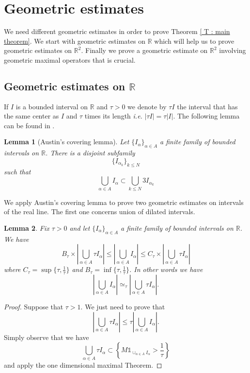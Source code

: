 \documentclass{article}
\newtheorem{lemma}{Lemma}
\begin{document}
\section{Geometric estimates}\label{S:geometric estimate}

We need different geometric estimates in order to prove Theorem \ref{ T : main theorem}. We start with geometric estimates on $\mathbb{R}$ which will help us to prove geometric estimates on $\mathbb{R}^2$. Finally we prove a geometric estimate on $\mathbb{R}^2$ involving geometric maximal operators that is crucial.




\subsection*{Geometric estimates on $\mathbb{R}$}

If $I$ is a bounded interval on $\mathbb{R}$ and $\tau >0$ we denote by $\tau I$ the interval that has the same center as $I$ and $\tau$ times its length \textit{i.e.} $ \left|\tau I \right| = \tau \left| I \right|$. The following lemma can be found in \cite{AUSTIN}.

\begin{lemma}[Austin's covering lemma]
Let $\{ I_\alpha \}_{\alpha \in A}$ a finite family of bounded intervals on $\mathbb{R}$. There is a disjoint subfamily $$\{ I_{ \alpha_k} \}_{k \leq N} $$ such that $$ \bigcup_{\alpha \in A} I_\alpha \subset  \bigcup_{k \leq N} 3 I_{\alpha_k} $$
\end{lemma}

We apply Austin's covering lemma to prove two geometric estimates on intervals of the real line. The first one concerns union of dilated intervals.

\begin{lemma}\label{ L : interval dil }
Fix $\tau > 0$ and let $\{ I_\alpha \}_{\alpha \in A}$ a finite family of bounded intervals on $\mathbb{R}$. We have $$B_\tau \times \left|\bigcup_{\alpha \in A} \tau I_\alpha \right| \leq  \left|\bigcup_{\alpha \in A} I_\alpha \right| \leq C_\tau \times \left|\bigcup_{\alpha \in A} \tau I_\alpha \right|$$ where $C_\tau = \sup \{ \tau , \frac{1}{\tau} \}$ and $B_\tau = \inf \{ \tau , \frac{1}{\tau} \}$. In other words we have $$  \left|\bigcup_{\alpha \in A} I_\alpha \right| \simeq_{\tau} \left|\bigcup_{\alpha \in A} \tau I_\alpha \right|.$$
\end{lemma}

\begin{proof}

Suppose that $\tau > 1$. We just need to prove that $$ \left|\bigcup_{\alpha \in A} \tau I_\alpha \right| \leq \tau \left|\bigcup_{\alpha \in A} I_\alpha \right|.$$ Simply observe that we have $$ \bigcup_{\alpha \in A} \tau I_\alpha \subset \left\{ M \mathbb{1}_{ \cup_{ \alpha \in A} I_\alpha } > \frac{1}{\tau}\right\} $$ and apply the one dimensional maximal Theorem.


\end{proof}
\end{document}
